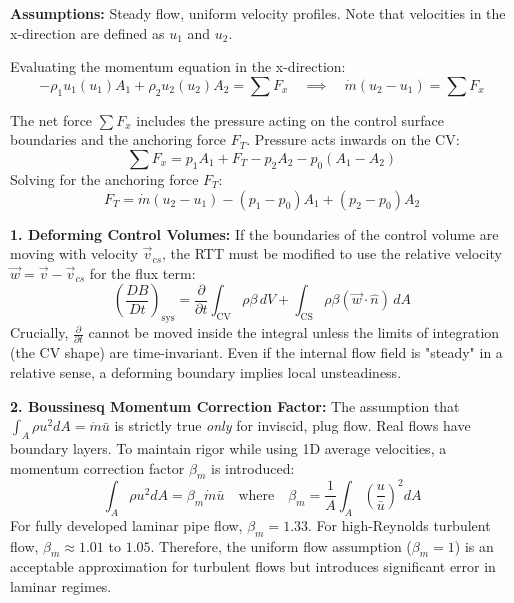 \textbf{Assumptions:} Steady flow, uniform velocity profiles. Note that velocities in the x-direction are defined as $u_1$ and $u_2$.

Evaluating the momentum equation in the x-direction:
\begin{equation}
    -\rho_1 u_1(u_1)A_1 + \rho_2 u_2(u_2)A_2 = \sum F_x \quad \implies \quad \dot{m}(u_2 - u_1) = \sum F_x
\end{equation}

The net force $\sum F_x$ includes the pressure acting on the control surface boundaries and the anchoring force $F_T$. Pressure acts inwards on the CV:
\begin{equation}
    \sum F_x = p_1 A_1 + F_T - p_2 A_2 - p_0(A_1 - A_2)
\end{equation}
Solving for the anchoring force $F_T$:
\begin{equation}
    F_T = \dot{m}(u_2 - u_1) - (p_1 - p_0)A_1 + (p_2 - p_0)A_2
\end{equation}

\begin{expertbox}
\textbf{1. Deforming Control Volumes:} If the boundaries of the control volume are moving with velocity $\vec{v}_{cs}$, the RTT must be modified to use the relative velocity $\vec{w} = \vec{v} - \vec{v}_{cs}$ for the flux term:
\begin{equation}
    \left( \frac{DB}{Dt} \right)_{\text{sys}} = \frac{\partial}{\partial t}\int_{\text{CV}} \rho \beta \, dV + \int_{\text{CS}} \rho \beta (\vec{w} \cdot \hat{n}) \, dA
\end{equation}
Crucially, $\frac{\partial}{\partial t}$ cannot be moved inside the integral unless the limits of integration (the CV shape) are time-invariant. Even if the internal flow field is "steady" in a relative sense, a deforming boundary implies local unsteadiness.

\textbf{2. Boussinesq Momentum Correction Factor:} The assumption that $\int_{A} \rho u^2 dA = \dot{m} \bar{u}$ is strictly true \textit{only} for inviscid, plug flow. Real flows have boundary layers. To maintain rigor while using 1D average velocities, a momentum correction factor $\beta_m$ is introduced:
\begin{equation}
    \int_{A} \rho u^2 dA = \beta_m \dot{m} \bar{u} \quad \text{where} \quad \beta_m = \frac{1}{A}\int_{A} \left(\frac{u}{\bar{u}}\right)^2 dA
\end{equation}
For fully developed laminar pipe flow, $\beta_m = 1.33$. For high-Reynolds turbulent flow, $\beta_m \approx 1.01$ to $1.05$. Therefore, the uniform flow assumption ($\beta_m=1$) is an acceptable approximation for turbulent flows but introduces significant error in laminar regimes.
\end{expertbox}


